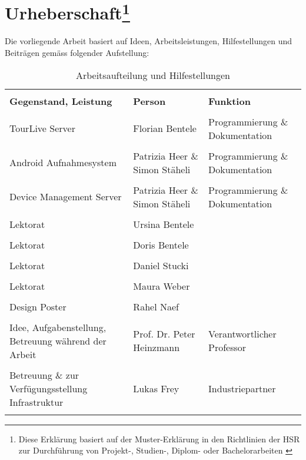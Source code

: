\chapter*{Urheberschaft\footnote{Diese Erklärung basiert auf der Muster-Erklärung in den Richtlinien der HSR zur Durchführung
von Projekt-, Studien-, Diplom- oder Bachelorarbeiten \cite{hsrerklaerung}}}


Die vorliegende Arbeit basiert auf Ideen, Arbeitsleistungen, Hilfestellungen und Beiträgen gemäss folgender Aufstellung:

\begin{longtable}{>{\RaggedRight}p{4cm}|>{\RaggedRight}p{4cm}|>{\RaggedRight}p{4cm}}
 & &  \\ [-1.5ex]
\textbf{Gegenstand, Leistung} & \textbf{Person} & \textbf{Funktion} \\ [1ex] \hline \hline & &  \\ [-1.5ex]
TourLive Server & Florian Bentele & Programmierung \& Dokumentation \\ [1ex] \hline & &  \\ [-1.5ex]
Android Aufnahmesystem & Patrizia Heer \& Simon Stäheli & Programmierung \& Dokumentation \\ [1ex] \hline & &  \\ [-1.5ex]
Device Management Server & Patrizia Heer \& Simon Stäheli & Programmierung \& Dokumentation \\ [1ex] \hline & &  \\ [-1.5ex]
Lektorat & Ursina Bentele &  \\ [1ex] \hline & &  \\ [-1.5ex]
Lektorat & Doris Bentele &  \\ [1ex] \hline & &  \\ [-1.5ex]
Lektorat & Daniel Stucki &  \\ [1ex] \hline & &  \\ [-1.5ex]
Lektorat & Maura Weber &  \\ [1ex] \hline & &  \\ [-1.5ex]
Design Poster & Rahel Naef &  \\ [1ex] \hline & &  \\ [-1.5ex]
Idee, Aufgabenstellung, Betreuung während der Arbeit & Prof. Dr. Peter Heinzmann & Verantwortlicher Professor \\ [1ex] \hline & &  \\ [-1.5ex]
Betreuung \& zur Verfügungsstellung Infrastruktur & Lukas Frey & Industriepartner \\ [1ex] 
\caption{Arbeitsaufteilung und Hilfestellungen}
\end{longtable} 


